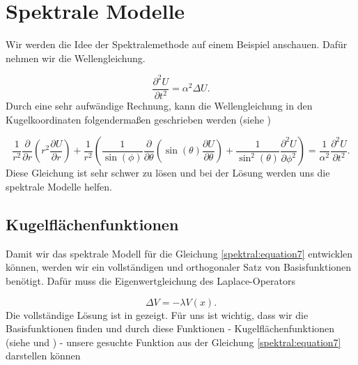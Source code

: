 %
%
%
%
\section{Spektrale Modelle 
\label{spektral:section:spektralemodelle}}

Wir werden die Idee der Spektralemethode auf einem Beispiel anschauen. Dafür nehmen wir die Wellengleichung.

\begin{equation}
 \dfrac{\partial^2U}{\partial{t^2}} = \alpha^2\Delta{U}.
\label{spektral:equation7}
\end{equation}
Durch eine sehr aufwändige Rechnung, kann die Wellengleichung in den Kugelkoordinaten folgendermaßen geschrieben werden (siehe \cite[Anhang B]{spektral:QuantenmechanikMathemathischesSeminar})

\begin{equation}
 \frac{1}{r^2}\frac{\partial}{\partial{r}}\left(r^2\frac{\partial{U}}{\partial{r}}\right) + \frac{1}{r^2}\left(\frac{1}{\sin(\phi)}\frac{\partial}{\partial{\theta}}\left(\sin(\theta)\frac{\partial{U}}{\partial{\theta}}\right) + \frac{1}{\sin^2(\theta)}\frac{\partial^2{U}}{\partial{\phi^2}}\right) = \frac{1}{\alpha^2}\frac{\partial^2{U}}{\partial{t^2}}.
\label{spektral:equation8}
\end{equation}
Diese Gleichung ist sehr schwer zu lösen und bei der Lösung werden uns die spektrale Modelle helfen.

\subsection{Kugelflächenfunktionen
\label{spektral:subsection:kugelflaechenfunktionen}}

Damit wir das spektrale Modell für die Gleichung \eqref{spektral:equation7} entwicklen können, werden wir ein vollständigen und orthogonaler Satz von Basisfunktionen benötigt.
Dafür muss die Eigenwertgleichung des Laplace-Operators 

\begin{equation}
 \Delta{V} = -\lambda{V(x)}.
\label{spektral:equation9}
\end{equation}
Die vollständige Lösung ist in \cite[Seite 62]{spektral:NichtkommutativeBildvearbeitung} gezeigt.
Für uns ist wichtig, dass wir die Basisfunktionen finden und durch diese Funktionen - Kugelflächenfunktionen (siehe \cite{spektral:MathsemSpezfunk} und \cite{spektral:NichtkommutativeBildvearbeitung}) - unsere gesuchte Funktion aus der Gleichung \eqref{spektral:equation7} darstellen können

